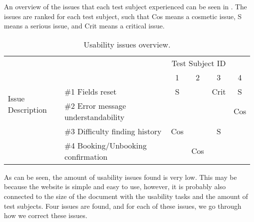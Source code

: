 An overview of the issues that each test subject experienced can be seen in .
The issues are ranked for each test subject, such that Cos means a cosmetic issue, S means a serious issue, and Crit means a critical issue.
\begin{table}[h]
	\centering
	\begin{tabular}{ll|cccc}
		\multicolumn{1}{c}{}&\multicolumn{4}{r}{Test Subject ID}&\\
		\multicolumn{2}{c|}{}&1&2&3&4\\
		\cline{2-6}
		\multirow{2}{*}{Issue Description}& {\#}1 Fields reset & S &  & Crit & S\\
		& {\#}2 Error message understandability &  &  &  & Cos\\
		& {\#}3 Difficulty finding history & Cos &  & S & \\
		& {\#}4 Booking/Unbooking confirmation &  & Cos &  & \\
	\end{tabular}
	\caption{Usability issues overview.}\label{tab:usabilityissues}
\end{table}

As can be seen, the amount of usability issues found is very low.
This may be because the website is simple and easy to use, however, it is probably also connected to the size of the document with the usability tasks and the amount of test subjects.
Four issues are found, and for each of these issues, we go through how we correct these issues.

